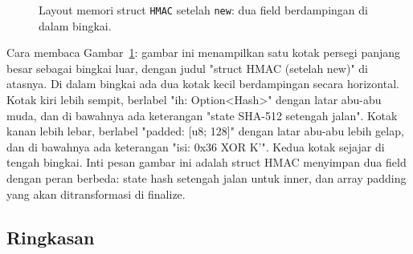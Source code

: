 \documentclass[11pt,a4paper]{article}
\begin{document}
\begin{figure}[H]
	\centering
	\caption{Layout memori struct \texttt{HMAC} setelah \texttt{new}: dua field berdampingan di dalam bingkai.}
	\label{fig:hmac-struct}
\end{figure}

Cara membaca Gambar~\ref{fig:hmac-struct}: gambar ini menampilkan satu kotak persegi panjang besar sebagai bingkai luar, dengan judul "struct HMAC (setelah new)" di atasnya. Di dalam bingkai ada dua kotak kecil berdampingan secara horizontal. Kotak kiri lebih sempit, berlabel "ih: Option<Hash>" dengan latar abu-abu muda, dan di bawahnya ada keterangan "state SHA-512 setengah jalan". Kotak kanan lebih lebar, berlabel "padded: [u8; 128]" dengan latar abu-abu lebih gelap, dan di bawahnya ada keterangan "isi: 0x36 XOR K'". Kedua kotak sejajar di tengah bingkai. Inti pesan gambar ini adalah struct HMAC menyimpan dua field dengan peran berbeda: state hash setengah jalan untuk inner, dan array padding yang akan ditransformasi di finalize.

\subsection{Ringkasan}
\end{document}
